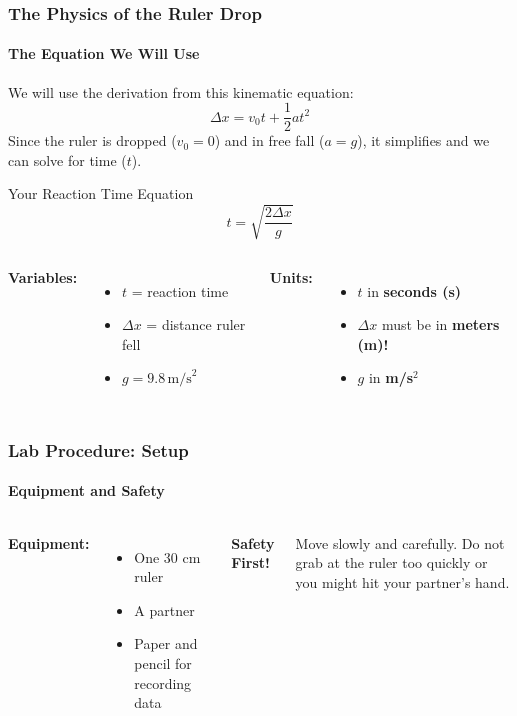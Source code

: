\documentclass{beamer}
\begin{document}
\begin{frame}
\frametitle{The Physics of the Ruler Drop}
\framesubtitle{The Equation We Will Use}
    We will use the derivation from this kinematic equation:
    \[ \Delta x = v_0 t + \frac{1}{2} a t^2 \]
    \pause
    Since the ruler is dropped ($v_0=0$) and in free fall ($a=g$), it simplifies and we can solve for time ($t$).
    
    \begin{block}{Your Reaction Time Equation}
        \[ t = \sqrt{\frac{2 \Delta x}{g}} \]
    \end{block}
    \pause
    \vfill
    \begin{columns}[T]
            \textbf{Variables:}
            \begin{itemize}
                \item $t$ = reaction time
                \item $\Delta x$ = distance ruler fell
                \item $g = 9.8 \, \text{m/s}^2$
            \end{itemize}
            \textbf{Units:}
            \begin{itemize}
                \item $t$ in \textbf{seconds (s)}
                \item $\Delta x$ must be in \textbf{meters (m)!}
                \item $g$ in \textbf{m/s$^2$}
            \end{itemize}
    \end{columns}
\end{frame}

\begin{frame}
\frametitle{Lab Procedure: Setup}
\framesubtitle{Equipment and Safety}
    \begin{columns}[T]
        \textbf{Equipment:}
            \begin{itemize}
                \item One 30 cm ruler
                \item A partner
                \item Paper and pencil for recording data
            \end{itemize}
        
        \textbf{Safety First!}
            \begin{alertblock}{}
                Move slowly and carefully. Do not grab at the ruler too quickly or you might hit your partner's hand.
            \end{alertblock}
    \end{columns}
\end{frame}
\end{document}
